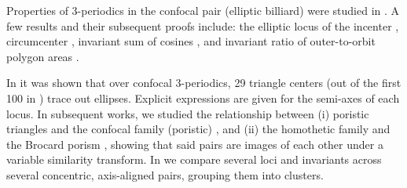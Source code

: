 Properties of 3-periodics in the confocal pair (elliptic billiard) were studied in \cite{reznik2020-intelligencer,garcia2020-new-properties}. A few results and their subsequent proofs include: the elliptic locus of the incenter \cite{olga14,garcia2019-incenter}, circumcenter \cite{garcia2019-incenter,corentin19}, invariant sum of cosines  \cite{akopyan2020-invariants,bialy2020-invariants}, and invariant ratio of outer-to-orbit polygon areas  \cite{caliz2020-area-product}. 
 
In \cite{garcia2020-ellipses} it was shown that over confocal 3-periodics, 29 triangle centers (out of the first 100 in \cite{etc}) trace out ellipses. Explicit expressions are given for the semi-axes of each locus. In subsequent works, we studied the relationship between (i) poristic triangles and the confocal family (poristic) \cite{garcia2020-similarity-I}, and (ii) the homothetic family and the Brocard porism \cite{reznik2020-similarityII}, showing that said pairs are images of each other under a variable similarity transform. In \cite{garcia2020-family-ties} we compare several loci and invariants across several concentric, axis-aligned pairs, grouping them into clusters.


 
